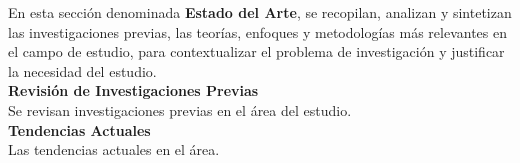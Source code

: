 
En esta sección denominada \textbf{Estado del Arte}, se recopilan, analizan y sintetizan las investigaciones previas, las teorías, enfoques y metodologías más relevantes en el campo de estudio, para contextualizar el problema de investigación y justificar la necesidad del estudio. \cite{referencia2} \\
\textbf{{Revisión de Investigaciones Previas}} \\
Se revisan investigaciones previas en el área del estudio. \\
\textbf{{Tendencias Actuales}}\\
Las tendencias actuales en el área.


